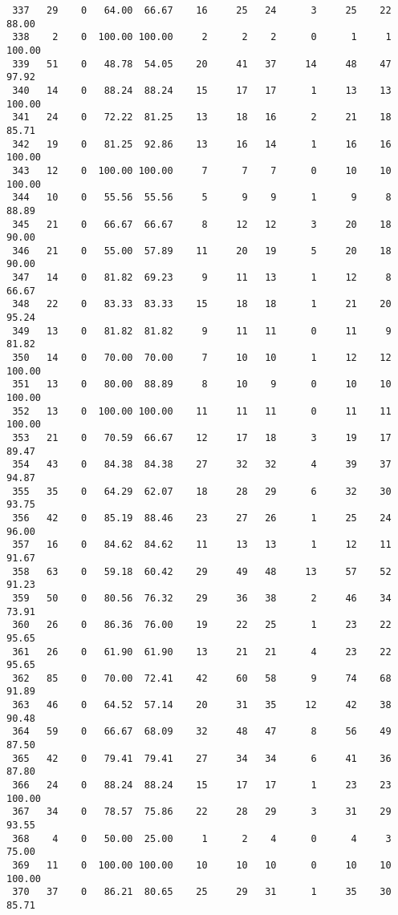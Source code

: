 \begin{verbatim}
 337   29    0   64.00  66.67    16     25   24      3     25    22    88.00
 338    2    0  100.00 100.00     2      2    2      0      1     1   100.00
 339   51    0   48.78  54.05    20     41   37     14     48    47    97.92
 340   14    0   88.24  88.24    15     17   17      1     13    13   100.00
 341   24    0   72.22  81.25    13     18   16      2     21    18    85.71
 342   19    0   81.25  92.86    13     16   14      1     16    16   100.00
 343   12    0  100.00 100.00     7      7    7      0     10    10   100.00
 344   10    0   55.56  55.56     5      9    9      1      9     8    88.89
 345   21    0   66.67  66.67     8     12   12      3     20    18    90.00
 346   21    0   55.00  57.89    11     20   19      5     20    18    90.00
 347   14    0   81.82  69.23     9     11   13      1     12     8    66.67
 348   22    0   83.33  83.33    15     18   18      1     21    20    95.24
 349   13    0   81.82  81.82     9     11   11      0     11     9    81.82
 350   14    0   70.00  70.00     7     10   10      1     12    12   100.00
 351   13    0   80.00  88.89     8     10    9      0     10    10   100.00
 352   13    0  100.00 100.00    11     11   11      0     11    11   100.00
 353   21    0   70.59  66.67    12     17   18      3     19    17    89.47
 354   43    0   84.38  84.38    27     32   32      4     39    37    94.87
 355   35    0   64.29  62.07    18     28   29      6     32    30    93.75
 356   42    0   85.19  88.46    23     27   26      1     25    24    96.00
 357   16    0   84.62  84.62    11     13   13      1     12    11    91.67
 358   63    0   59.18  60.42    29     49   48     13     57    52    91.23
 359   50    0   80.56  76.32    29     36   38      2     46    34    73.91
 360   26    0   86.36  76.00    19     22   25      1     23    22    95.65
 361   26    0   61.90  61.90    13     21   21      4     23    22    95.65
 362   85    0   70.00  72.41    42     60   58      9     74    68    91.89
 363   46    0   64.52  57.14    20     31   35     12     42    38    90.48
 364   59    0   66.67  68.09    32     48   47      8     56    49    87.50
 365   42    0   79.41  79.41    27     34   34      6     41    36    87.80
 366   24    0   88.24  88.24    15     17   17      1     23    23   100.00
 367   34    0   78.57  75.86    22     28   29      3     31    29    93.55
 368    4    0   50.00  25.00     1      2    4      0      4     3    75.00
 369   11    0  100.00 100.00    10     10   10      0     10    10   100.00
 370   37    0   86.21  80.65    25     29   31      1     35    30    85.71

\end{verbatim}
